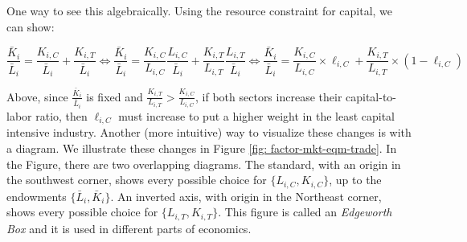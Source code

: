 \documentclass[11pt,letterpaper]{article}
\begin{document}
One way to see this algebraically. Using the resource constraint for capital, we can show:

\begin{equation}\label{eq: constrants-ratio}
    \frac{\bar{K}_i}{\bar{L}_i} = \frac{K_{i,C}}{\bar{L}_i} + \frac{K_{i,T}}{\bar{L}_i} \iff \frac{\bar{K}_i}{\bar{L}_i} = \frac{K_{i,C}}{L_{i,C}} \frac{L_{i,C}}{\bar{L}_i} + \frac{K_{i,T}}{L_{i,T}} \frac{L_{i,T}}{\bar{L}_i}  \iff \frac{\bar{K}_i}{\bar{L}_i} = \frac{K_{i,C}}{L_{i,C}} \times \ell_{i,C} + \frac{K_{i,T}}{L_{i,T}} \times (1-\ell_{i,C})
\end{equation}

Above, since $\frac{\bar{K}_i}{\bar{L}_i}$ is fixed and $\frac{K_{i,T}}{L_{i,T}} > \frac{K_{i,C}}{L_{i,C}}$, if both sectors increase their capital-to-labor ratio, then $\ell_{i,C}$ must increase to put a higher weight in the least capital intensive industry. Another (more intuitive) way to visualize these changes is with a diagram. We illustrate these changes in Figure \ref{fig: factor-mkt-eqm-trade}. In the Figure, there are two overlapping diagrams. The standard, with an origin in the southwest corner, shows every possible choice for $\{L_{i,C},K_{i,C}\}$, up to the endowments $\{\bar{L}_{i},\bar{K}_{i}\}$. An inverted axis, with origin in the Northeast corner, shows every possible choice for $\{L_{i,T},K_{i,T}\}$. This figure is called an \textit{Edgeworth Box} and it is used in different parts of economics.
\end{document}
